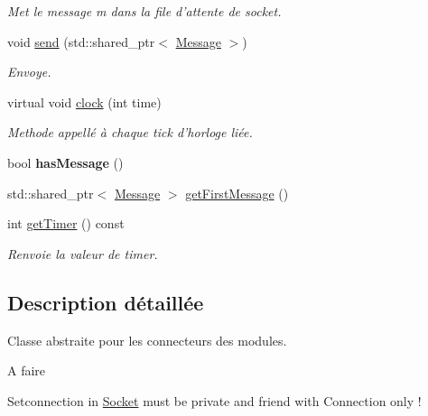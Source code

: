 \begin{DoxyCompactItemize}
\begin{DoxyCompactList}\small\item\em Met le message m dans la file d'attente de socket. \end{DoxyCompactList}\item 
void \hyperlink{classSocket_a06b687baf9b01f3e399a5ee040ca04e4}{send} (std\-::shared\-\_\-ptr$<$ \hyperlink{classMessage}{Message} $>$)
\begin{DoxyCompactList}\small\item\em Envoye. \end{DoxyCompactList}\item 
\hypertarget{classSocket_a6bd5bddfabd838a3388b445c21d3c41e}{virtual void \hyperlink{classSocket_a6bd5bddfabd838a3388b445c21d3c41e}{clock} (int time)}\label{classSocket_a6bd5bddfabd838a3388b445c21d3c41e}

\begin{DoxyCompactList}\small\item\em Methode appellé à chaque tick d'horloge liée. \end{DoxyCompactList}\item 
\hypertarget{classSocket_afe7c9b2ef7fb3653b14f5f462293549a}{bool {\bfseries has\-Message} ()}\label{classSocket_afe7c9b2ef7fb3653b14f5f462293549a}

\item 
std\-::shared\-\_\-ptr$<$ \hyperlink{classMessage}{Message} $>$ \hyperlink{classSocket_a71e162a0ca00b1a46fe23eaccb09f76d}{get\-First\-Message} ()
\item 
\hypertarget{classSocket_aa890633022a29b56ed3844684d32e0fc}{int \hyperlink{classSocket_aa890633022a29b56ed3844684d32e0fc}{get\-Timer} () const }\label{classSocket_aa890633022a29b56ed3844684d32e0fc}

\begin{DoxyCompactList}\small\item\em Renvoie la valeur de timer. \end{DoxyCompactList}\end{DoxyCompactItemize}


\subsection{Description détaillée}
Classe abstraite pour les connecteurs des modules. 

\begin{DoxyRefDesc}{A faire}
\item[\hyperlink{todo__todo000011}{A faire}]Setconnection in \hyperlink{classSocket}{Socket} must be private and friend with Connection only ! \end{DoxyRefDesc}


